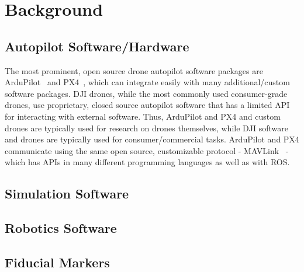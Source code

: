 \section{Background}

\subsection{Autopilot Software/Hardware}

The most prominent, open source drone autopilot software packages are ArduPilot~\cite{ardupilot_website} and PX4~\cite{pixhawk_website},
which can integrate easily with many additional/custom software packages.
DJI drones, while the most commonly used consumer-grade drones, use proprietary, closed source autopilot software
that has a limited API for interacting with external software.
Thus, ArduPilot and PX4 and custom drones are typically used for research on drones themselves,
while DJI software and drones are typically used for consumer/commercial tasks.
ArduPilot and PX4 communicate using the same open source, customizable protocol - MAVLink~\cite{mavlink_io} -
which has APIs in many different programming languages as well as with \gls{ROS}.

\subsection{Simulation Software}

\subsection{Robotics Software}

\subsection{Fiducial Markers}